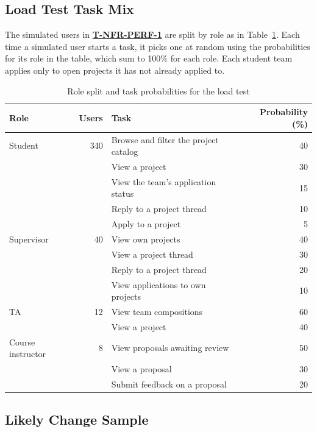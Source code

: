 \documentclass[12pt, titlepage]{article}
\begin{document}
\subsection{Load Test Task Mix}
\label{app:load-mix}

The simulated users in \hyperref[T-NFR-PERF-1]{\textbf{T-NFR-PERF-1}} are split
by role as in Table~\ref{tab:load-mix}. Each time a simulated user starts a
task, it picks one at random using the probabilities for its role in the
table, which sum to 100\% for each role. Each student team applies only to open projects it has not already applied to.

\begin{table}[h]
\centering
\caption{Role split and task probabilities for the load test}
\label{tab:load-mix}
\begin{tabular}{l r l r}
  \toprule
  \textbf{Role} & \textbf{Users} & \textbf{Task} & \textbf{Probability (\%)} \\
  \midrule
  Student & 340 & Browse and filter the project catalog & 40 \\
   & & View a project & 30 \\
   & & View the team's application status & 15 \\
   & & Reply to a project thread & 10 \\
   & & Apply to a project & 5 \\
  \midrule
  Supervisor & 40 & View own projects & 40 \\
   & & View a project thread & 30 \\
   & & Reply to a project thread & 20 \\
   & & View applications to own projects & 10 \\
  \midrule
  TA & 12 & View team compositions & 60 \\
   & & View a project & 40 \\
  \midrule
  Course instructor & 8 & View proposals awaiting review & 50 \\
   & & View a proposal & 30 \\
   & & Submit feedback on a proposal & 20 \\
  \bottomrule
\end{tabular}
\end{table}

\subsection{Likely Change Sample}
\label{app:change-sample}
\end{document}
